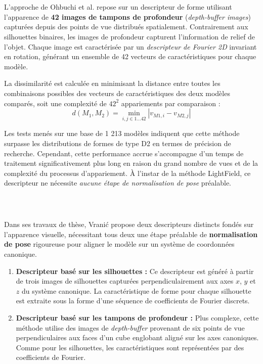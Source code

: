 \documentclass[11pt,a4paper,oneside]{report}
\begin{document}
\subsubsection{~\cite{ohbuchi94}}

L'approche de Ohbuchi et al. repose sur un descripteur de forme utilisant l'apparence de \textbf{42 images de tampons de profondeur} (\textit{depth-buffer images}) capturées depuis des points de vue distribués spatialement. Contrairement aux silhouettes binaires, les images de profondeur capturent l'information de relief de l'objet. Chaque image est caractérisée par un \textit{descripteur de Fourier 2D} invariant en rotation, générant un ensemble de 42 vecteurs de caractéristiques pour chaque modèle.

La dissimilarité est calculée en minimisant la distance entre toutes les combinaisons possibles des vecteurs de caractéristiques des deux modèles comparés, soit une complexité de $42^2$ appariements par comparaison : $$d(M_1, M_2) = \min_{i,j \in {1 \dots 42}} |v_{M1,i} - v_{M2,j}|$$

Les tests menés sur une base de 1 213 modèles indiquent que cette méthode surpasse les distributions de formes de type D2 en termes de précision de recherche. Cependant, cette performance accrue s'accompagne d'un temps de traitement significativement plus long en raison du grand nombre de vues et de la complexité du processus d'appariement. À l'instar de la méthode LightField, ce descripteur ne nécessite \textit{aucune étape de normalisation de pose} préalable.

\subsubsection{~\cite{vranic127}}

Dans ses travaux de thèse, Vranić propose deux descripteurs distincts fondés sur l'apparence visuelle, nécessitant tous deux une étape préalable de \textbf{normalisation de pose} rigoureuse pour aligner le modèle sur un système de coordonnées canonique. 

\begin{enumerate}
    \item \textbf{Descripteur basé sur les silhouettes :} Ce descripteur est généré à partir de trois images de silhouettes capturées perpendiculairement aux axes $x$, $y$ et $z$ du système canonique. La caractéristique de forme pour chaque silhouette est extraite sous la forme d'une séquence de coefficients de Fourier discrets.
    \item \textbf{Descripteur basé sur les tampons de profondeur :} Plus complexe, cette méthode utilise des images de \textit{depth-buffer} provenant de six points de vue perpendiculaires aux faces d'un cube englobant aligné sur les axes canoniques. Comme pour les silhouettes, les caractéristiques sont représentées par des coefficients de Fourier.
\end{enumerate}
\end{document}
